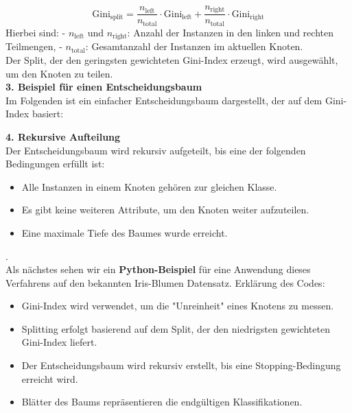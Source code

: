 \documentclass[12pt]{article}
\begin{document}
\[
\text{Gini}_{\text{split}} = \frac{n_{\text{left}}}{n_{\text{total}}} \cdot \text{Gini}_{\text{left}} + \frac{n_{\text{right}}}{n_{\text{total}}} \cdot \text{Gini}_{\text{right}}
\]
%
Hierbei sind:
- \( n_{\text{left}} \) und \( n_{\text{right}} \): Anzahl der Instanzen in den linken und rechten Teilmengen,
- \( n_{\text{total}} \): Gesamtanzahl der Instanzen im aktuellen Knoten.\\
%
Der Split, der den geringsten gewichteten Gini-Index erzeugt, wird ausgewählt, um den Knoten zu teilen.\\
%
\textbf{3. Beispiel für einen Entscheidungsbaum}\\
%
Im Folgenden ist ein einfacher Entscheidungsbaum dargestellt, der auf dem Gini-Index basiert:

\begin{center}
\end{center}
%
\textbf{4. Rekursive Aufteilung}\\
%
Der Entscheidungsbaum wird rekursiv aufgeteilt, bis eine der folgenden Bedingungen erfüllt ist:
\begin{itemize}
    \item Alle Instanzen in einem Knoten gehören zur gleichen Klasse.
    \item Es gibt keine weiteren Attribute, um den Knoten weiter aufzuteilen.
    \item Eine maximale Tiefe des Baumes wurde erreicht.
\end{itemize}
%
.\\
Als nächstes sehen wir ein \textbf{Python-Beispiel} für eine Anwendung dieses Verfahrens auf den bekannten Iris-Blumen Datensatz. Erklärung des Codes:
\begin{itemize}
    \item Gini-Index wird verwendet, um die "Unreinheit" eines Knotens zu messen.
    \item Splitting erfolgt basierend auf dem Split, der den niedrigsten gewichteten Gini-Index liefert.
    \item Der Entscheidungsbaum wird rekursiv erstellt, bis eine Stopping-Bedingung erreicht wird.
    \item Blätter des Baums repräsentieren die endgültigen Klassifikationen.
\end{itemize} 
\end{document}
